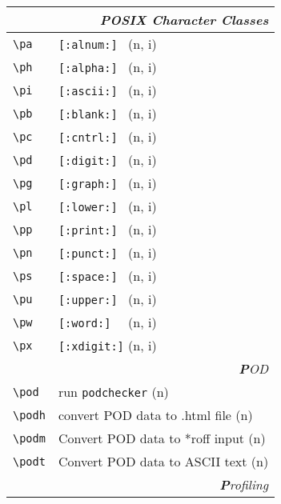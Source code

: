\documentclass[oneside,10pt,landscape,DIV17]{scrartcl}
\begin{document}
\begin{multicols}{3}
\begin{center}
\begin{tabular}[]{|p{11mm}|p{58mm}|}
\hline
\multicolumn{2}{|r|}{\textsl{\textbf{P}OSIX Character Classes}}\\[1.0ex]
\hline \verb'\pa' &  \verb'[:alnum:] '         \hfill (n, i)   \\
\hline \verb'\ph' &  \verb'[:alpha:] '         \hfill (n, i)   \\
\hline \verb'\pi' &  \verb'[:ascii:] '         \hfill (n, i)   \\
\hline \verb'\pb' &  \verb'[:blank:] '         \hfill (n, i)   \\
\hline \verb'\pc' &  \verb'[:cntrl:] '         \hfill (n, i)   \\
\hline \verb'\pd' &  \verb'[:digit:] '         \hfill (n, i)   \\
\hline \verb'\pg' &  \verb'[:graph:] '         \hfill (n, i)   \\
\hline \verb'\pl' &  \verb'[:lower:] '         \hfill (n, i)   \\
\hline \verb'\pp' &  \verb'[:print:] '         \hfill (n, i)   \\
\hline \verb'\pn' &  \verb'[:punct:] '         \hfill (n, i)   \\
\hline \verb'\ps' &  \verb'[:space:] '         \hfill (n, i)   \\
\hline \verb'\pu' &  \verb'[:upper:] '         \hfill (n, i)   \\
\hline \verb'\pw' &  \verb'[:word:]  '         \hfill (n, i)   \\
\hline \verb'\px' &  \verb'[:xdigit:]'         \hfill (n, i)   \\
\hline
\hline
\multicolumn{2}{|r|}{\textsl{\textbf{P}OD}}                       \\[1.0ex]
\hline \verb'\pod'    & run \verb'podchecker'           \hfill (n)\\
\hline \verb'\podh'   & convert POD data to .html file  \hfill (n)\\
\hline \verb'\podm'   & Convert POD data to *roff input \hfill (n)\\
\hline \verb'\podt'   & Convert POD data to ASCII text  \hfill (n)\\
\hline
\hline
\multicolumn{2}{|r|}{\textsl{\textbf{P}rofiling}}                 \\[1.0ex]

\end{tabular}
\end{center}
\end{multicols}
\end{document}
